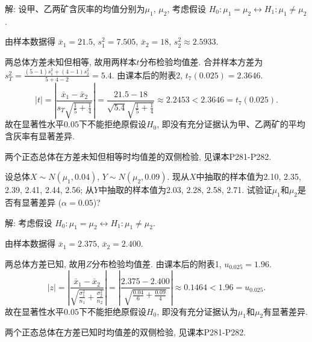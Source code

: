 \documentclass[standard]{ExBook}
\renewenvironment{shaded}{%
  \def\FrameCommand{\fboxsep=\FrameSep \colorbox{shadecolor}}%
  \MakeFramed{\advance\hsize-\width \FrameRestore}%
}{%
  \endMakeFramed
}
\begin{document}
\begin{qitems}
\vspace{\dimexpr2.5cm-5em\relax}

解: 设甲、乙两矿含灰率的均值分别为$\mu_1$, $\mu_2$, 考虑假设
$
H_0:\mu_1=\mu_2
\longleftrightarrow
H_1:\mu_1\neq\mu_2
$.

由样本数据得
$
\bar{x}_1=21.5
$,
$
s_1^2=7.505
$,
$
\bar{x}_2=18
$,
$
s_2^2\approx2.5933
$.

两总体方差未知但相等, 故用两样本$t$分布检验均值差. 合并样本方差为
$
s_T^2
=
\frac{(5-1)s_1^2+(4-1)s_2^2}{5+4-2}
=5.4
$.
由课本后的附表2, $t_7(0.025)=2.3646$.
$$
|t|
=
\left|
\frac{\bar{x}_1-\bar{x}_2}
{s_T\sqrt{\frac{1}{5}+\frac{1}{4}}}
\right|
=
\frac{21.5-18}
{\sqrt{5.4}\sqrt{\frac{1}{5}+\frac{1}{4}}}
\approx2.2453
<
2.3646
=
t_7(0.025).
$$
故在显著性水平$0.05$下不能拒绝原假设$H_0$, 即没有充分证据认为甲、乙两矿的平均含灰率有显著差异.

\textcolor{themeColor}{\selectfont {} 两个正态总体在方差未知但相等时均值差的双侧检验, 见课本P281-P282.}

\vspace{2.5cm-5em}

    \begin{bbox}
    \begin{shaded}
        \qitem
设总体$X \sim N(\mu_1,0.04)$, $Y \sim N(\mu_2,0.09)$. 现从$X$中抽取的样本值为2.10, 2.35, 2.39, 2.41, 2.44, 2.56; 从$Y$中抽取的样本值为2.03, 2.28, 2.58, 2.71. 试验证$\mu_1$和$\mu_2$是否有显著差异 ($\alpha=0.05$)?
    \end{shaded}
    \end{bbox}

\vspace{\dimexpr2.5cm-5em\relax}

解: 考虑假设
$
H_0:\mu_1=\mu_2
\longleftrightarrow
H_1:\mu_1\neq\mu_2
$.

由样本数据得
$
\bar{x}_1=2.375
$,
$
\bar{x}_2=2.400
$.

两总体方差已知, 故用$Z$分布检验均值差. 由课本后的附表1, $u_{0.025}=1.96$.
$$
|z|
=
\left|
\frac{\bar{x}_1-\bar{x}_2}
{\sqrt{\frac{\sigma_1^2}{n_1}+\frac{\sigma_2^2}{n_2}}}
\right|
=
\left|
\frac{2.375-2.400}
{\sqrt{\frac{0.04}{6}+\frac{0.09}{4}}}
\right|
\approx0.1464
<
1.96
=
u_{0.025}.
$$
故在显著性水平$0.05$下不能拒绝原假设$H_0$, 即没有充分证据认为$\mu_1$和$\mu_2$有显著差异.

\textcolor{themeColor}{\selectfont {} 两个正态总体在方差已知时均值差的双侧检验, 见课本P281-P282.}

\vspace{2.5cm-5em}


\end{qitems}
\end{document}
